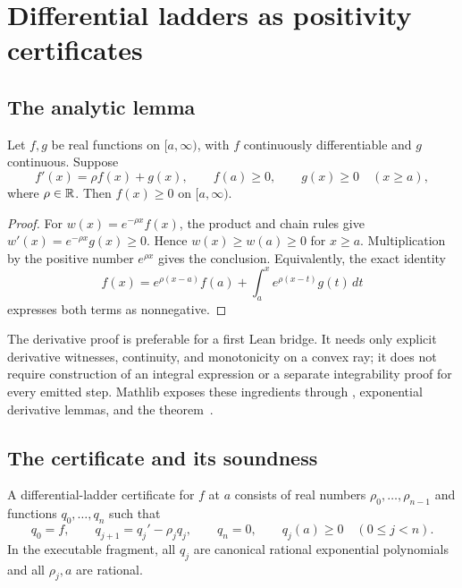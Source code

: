 \section{Differential ladders as positivity certificates}
\label{sec:ladders}

\subsection{The analytic lemma}

\begin{lemma}
\label{lem:step}
Let $f,g$ be real functions on $[a,\infty)$, with $f$ continuously
differentiable and $g$ continuous. Suppose
\[
 f'(x)=\rho f(x)+g(x),\qquad f(a)\ge0,\qquad
 g(x)\ge0\quad(x\ge a),
\]
where $\rho\in\mathbb R$. Then $f(x)\ge0$ on $[a,\infty)$.
\end{lemma}
\begin{proof}
For $w(x)=e^{-\rho x}f(x)$, the product and chain rules give
$w'(x)=e^{-\rho x}g(x)\ge0$. Hence $w(x)\ge w(a)\ge0$ for $x\ge a$.
Multiplication by the positive number $e^{\rho x}$ gives the conclusion.
Equivalently, the exact identity
\begin{equation}
 f(x)=e^{\rho(x-a)}f(a)+
       \int_a^x e^{\rho(x-t)}g(t)\,dt
 \label{eq:integrating-factor}
\end{equation}
expresses both terms as nonnegative.
\end{proof}

The derivative proof is preferable for a first Lean bridge. It needs only
explicit derivative witnesses, continuity, and monotonicity on a convex ray;
it does not require construction of an integral expression or a separate
integrability proof for every emitted step. Mathlib exposes these ingredients
through , exponential derivative lemmas, and the
 theorem~\cite{mathlib-meanvalue,mathlib-expderiv}.

\subsection{The certificate and its soundness}

\begin{definition}
A differential-ladder certificate for $f$ at $a$ consists of real numbers
$\rho_0,\ldots,\rho_{n-1}$ and functions $q_0,\ldots,q_n$ such that
\begin{equation}
 q_0=f,\qquad q_{j+1}=q_j'-\rho_jq_j,\qquad
 q_n=0,\qquad q_j(a)\ge0\quad(0\le j<n).
 \label{eq:ladder}
\end{equation}
In the executable fragment, all $q_j$ are canonical rational exponential
polynomials and all $\rho_j,a$ are rational.
\end{definition}

